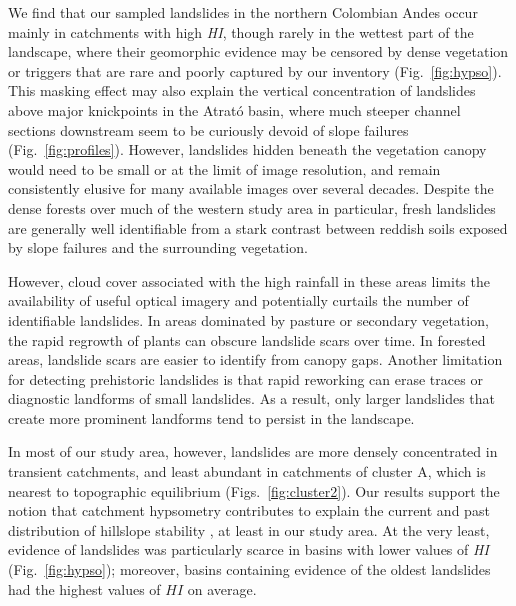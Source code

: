 \documentclass[draft]{agujournal2019}
\begin{document}
\par We find that our sampled landslides in the northern Colombian Andes occur mainly in catchments with high \textit{HI}, though rarely in the wettest part of the landscape, where their geomorphic evidence may be censored by dense vegetation or triggers that are rare and poorly captured by our inventory (Fig.~\ref{fig:hypso}). This masking effect may also explain the vertical concentration of landslides above major knickpoints in the Atrató basin, where much steeper channel sections downstream seem to be curiously devoid of slope failures (Fig.~\ref{fig:profiles}). However, landslides hidden beneath the vegetation canopy would need to be small or at the limit of image resolution, and remain consistently elusive for many available images over several decades. Despite the dense forests over much of the western study area in particular, fresh landslides are generally well identifiable from a stark contrast between reddish soils exposed by slope failures and the surrounding vegetation.

\par However, cloud cover associated with the high rainfall in these areas limits the availability of useful optical imagery and potentially curtails the number of identifiable landslides. In areas dominated by pasture or secondary vegetation, the rapid regrowth of plants can obscure landslide scars over time. In forested areas, landslide scars are easier to identify from canopy gaps. Another limitation for detecting prehistoric landslides is that rapid reworking can erase traces or diagnostic landforms of small landslides. As a result, only larger landslides that create more prominent landforms tend to persist in the landscape. 

\par In most of our study area, however, landslides are more densely concentrated in transient catchments, and least abundant in catchments of cluster A, which is nearest to topographic equilibrium (Figs.~\ref{fig:cluster2}). Our results support the notion that catchment hypsometry contributes to explain the current and past distribution of hillslope stability \cite{Gallen2011}, at least in our study area. At the very least, evidence of landslides was particularly scarce in basins with lower values of \textit{HI} (Fig.~\ref{fig:hypso}); moreover, basins containing evidence of the oldest landslides had the highest values of $HI$ on average.
\end{document}
